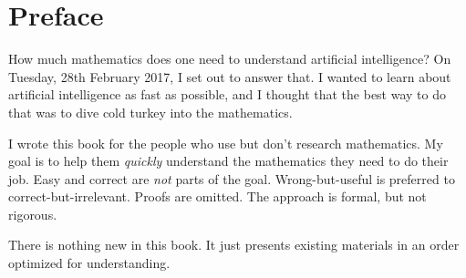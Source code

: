 \chapter*{Preface}

How much mathematics does one need to understand artificial intelligence?
On Tuesday, 28th February 2017, I set out to answer that.
I wanted to learn about artificial intelligence as fast as possible,
and I thought that the best way to do that was to dive cold turkey into the mathematics.

I wrote this book for the people who use
but don't research mathematics.
My goal is to help them \emph{quickly} understand
the mathematics they need to do their job.
Easy and correct are \emph{not} parts of the goal.
Wrong-but-useful is preferred to correct-but-irrelevant.
Proofs are omitted.
The approach is formal, but not rigorous.

There is nothing new in this book.
It just presents existing materials
in an order optimized for understanding.
